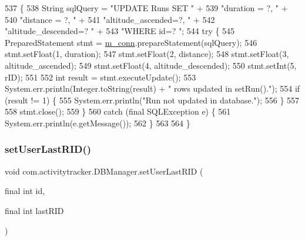 \begin{DoxyCode}
537                                                                                              \{
538         String sqlQuery = \textcolor{stringliteral}{"UPDATE Runs SET "} +
539                 \textcolor{stringliteral}{"duration = ?, "} +
540                 \textcolor{stringliteral}{"distance = ?, "} +
541                 \textcolor{stringliteral}{"altitude\_ascended=?, "} +
542                 \textcolor{stringliteral}{"altitude\_descended=? "} +
543                 \textcolor{stringliteral}{"WHERE id=? "};
544         \textcolor{keywordflow}{try} \{
545             PreparedStatement stmt = \mbox{\hyperlink{classcom_1_1activitytracker_1_1_d_b_manager_a064088d13ac09eb147fdc19268771521}{m\_conn}}.prepareStatement(sqlQuery);
546             stmt.setFloat(1, duration);
547             stmt.setFloat(2, distance);
548             stmt.setFloat(3, altitude\_ascended);
549             stmt.setFloat(4, altitude\_descended);
550             stmt.setInt(5, rID);
551 
552             \textcolor{keywordtype}{int} result = stmt.executeUpdate();
553             System.err.println(Integer.toString(result) + \textcolor{stringliteral}{" rows updated in setRun()."});
554             \textcolor{keywordflow}{if} (result != 1) \{
555                 System.err.println(\textcolor{stringliteral}{"Run not updated in database."});
556             \}
557 
558             stmt.close();
559         \}
560         \textcolor{keywordflow}{catch} (\textcolor{keyword}{final} SQLException e) \{
561             System.err.println(e.getMessage());
562         \}
563 
564     \}
\end{DoxyCode}
\mbox{\label{classcom_1_1activitytracker_1_1_d_b_manager_a93b7fc4c2d0083e125852d84f087a8d3}} 
\subsubsection{\texorpdfstring{set\+User\+Last\+R\+I\+D()}{setUserLastRID()}}
{\footnotesize\ttfamily void com.\+activitytracker.\+D\+B\+Manager.\+set\+User\+Last\+R\+ID (\begin{DoxyParamCaption}\item[{final int}]{id,  }\item[{final int}]{last\+R\+ID }\end{DoxyParamCaption})}

